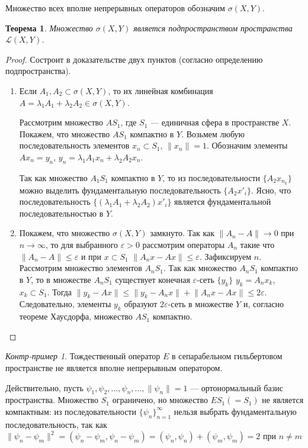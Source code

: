 \documentclass[12pt,a4paper,titlepage,oneside]{book}
\theoremstyle{definition}
\theoremstyle{plain}
\newtheorem*{theorem}{Теорема}
\theoremstyle{break}
\theoremstyle{remark}
\theoremstyle{remark}
\theoremstyle{remark}
\theoremstyle{remark}
\newtheorem*{cexample}{Контр-пример}
\theoremstyle{plain}
\theoremstyle{plain}
\begin{document}
Множество всех вполне непрерывных операторов обозначим $\sigma(X,Y)$.
\begin{theorem}Множество $\sigma(X,Y)$ является подпространством пространства $\mathcal{L}(X, Y)$.
\end{theorem}
\begin{proof}Состроит в доказательстве двух пунктов (согласно определению подпространства).

\begin{enumerate}

	\item Если $A_1, A_2 \subset \sigma(X,Y)$, то их линейная комбинация $A=\lambda_1 A_1+\lambda_2 A_2\in \sigma(X,Y)$.

Рассмотрим множество $AS_1$, где $S_1$ --- единичная сфера в пространстве $X$. Покажем, что множество $AS_1$ компактно в $Y$. Возьмем любую последовательность элементов $x_n \subset S_1$, $\lVert x_n \rVert=1$. Обозначим элементы $Ax_n=y_n$, $y_n=\lambda_1 A_1 x_n+\lambda_2 A_2 x_n$.

Так как множество $A_1S_1$ компактно в $Y$, то из последовательности $\lbrace A_2x_{n_k} \rbrace$ можно выделить фундаментальную последовательность $\lbrace A_2x'_i \rbrace$. Ясно, что последовательность $\lbrace (\lambda_1 A_1+\lambda_2 A_2)x'_i \rbrace$ является фундаментальной последовательностью в $Y$.

	\item Покажем, что множество $\sigma(X,Y)$ замкнуто. Так как $\lVert A_n-A \rVert \to 0$ при $n\to \infty$, то для выбранного $\varepsilon > 0$ рассмотрим операторы $A_n$ такие что $\lVert A_n-A \rVert \leqslant  \varepsilon$ и при $x \subset S_1$ $\lVert A_n x-Ax\rVert \leqslant  \varepsilon$. Зафиксируем $n$. Рассмотрим множество элементов $A_n S_1$. Так как множество $A_n S_1$ компактно в $Y$, то в множестве $A_n S_1$ существует конечная $\varepsilon$-сеть $\lbrace y_k \rbrace$ $y_k=A_n x_k$, $x_k \subset S_1$. Тогда $\lVert y_k - Ax\rVert \leqslant \lVert y_k - A_n x\rVert + \lVert A_n x - Ax\rVert \leqslant 2\varepsilon$. Следовательно, элементы $y_k$ образуют $2\varepsilon$-сеть в множестве $Y$ и, согласно теореме Хаусдорфа, множество $AS_1$ компактно.
\qedhere
\end{enumerate}
\end{proof}

\begin{cexample}Тождественный оператор $E$ в сепарабельном гильбертовом пространстве не является вполне непрерывным оператором.

Действительно, пусть $\psi_1,\psi_2,\ldots,\psi_n,\ldots, \lVert\psi_n\rVert =1$ --- ортонормальный базис пространства. Множество $S_1$ ограничено, но множество $ES_1 (=S_1)$ не является компактным: из последовательности $\lbrace \psi_n \rbrace_{n=1}^{\infty}$ нельзя выбрать фундаментальную последовательность, так как $\lVert\psi_n - \psi_m \rVert ^2=(\psi_n - \psi_m, \psi_n - \psi_m)= (\psi_n,\psi_n)+ (\psi_m,\psi_m)=2$ при $n \neq m$
\end{cexample}
\end{document}
